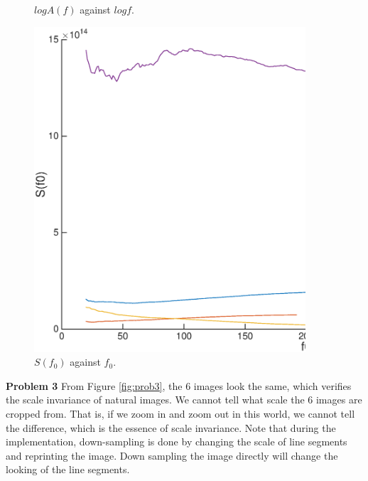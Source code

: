 \documentclass[11pt, oneside]{article}   	%
\begin{document}
\begin{enumerate}
\begin{figure}[H]
	\caption{$log A(f)$ against $log f$.}
	\label {fig:Af}
\end{figure}
\begin{figure}[H]
	\centering
	\includegraphics[width=0.9\textwidth]{Sf}
	\caption{$S(f_0)$ against $f_0$.}
	\label {fig:Sf}
\end{figure}

\end{enumerate}
{\bf Problem 3}
From Figure \ref{fig:prob3}, the 6 images look the same, which verifies the scale invariance of natural images. We cannot tell what scale the 6 images are cropped from. That is, if we zoom in and zoom out in this world, we cannot tell the difference, which is the essence of scale invariance. Note that during the implementation, down-sampling is done by changing the scale of line segments and reprinting the image. Down sampling the image directly will change the looking of the line segments.
\end{document}
